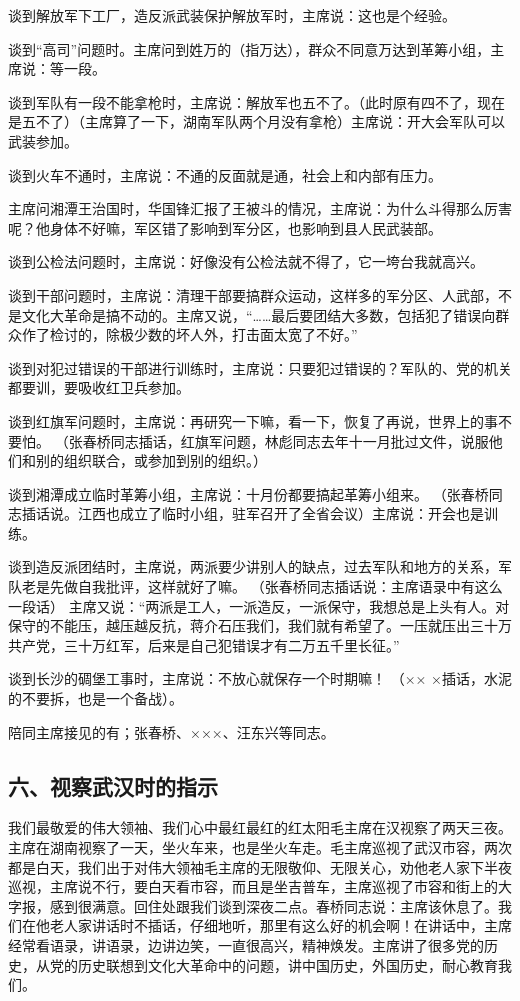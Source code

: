 谈到解放军下工厂，造反派武装保护解放军时，主席说：这也是个经验。

谈到“高司”问题时。主席问到姓万的（指万达），群众不同意万达到革筹小组，主席说：等一段。

谈到军队有一段不能拿枪时，主席说：解放军也五不了。（此时原有四不了，现在是五不了）（主席算了一下，湖南军队两个月没有拿枪）主席说：开大会军队可以武装参加。

谈到火车不通时，主席说：不通的反面就是通，社会上和内部有压力。

主席问湘潭王治国时，华国锋汇报了王被斗的情况，主席说：为什么斗得那么厉害呢？他身体不好嘛，军区错了影响到军分区，也影响到县人民武装部。

谈到公检法问题时，主席说：好像没有公检法就不得了，它一垮台我就高兴。

谈到干部问题时，主席说：清理干部要搞群众运动，这样多的军分区、人武部，不是文化大革命是搞不动的。主席又说，“……最后要团结大多数，包括犯了错误向群众作了检讨的，除极少数的坏人外，打击面太宽了不好。”

谈到对犯过错误的干部进行训练时，主席说：只要犯过错误的？军队的、党的机关都要训，要吸收红卫兵参加。

谈到红旗军问题时，主席说：再研究一下嘛，看一下，恢复了再说，世界上的事不要怕。  （张春桥同志插话，红旗军问题，林彪同志去年十一月批过文件，说服他们和别的组织联合，或参加到别的组织。）

谈到湘潭成立临时革筹小组，主席说：十月份都要搞起革筹小组来。 （张春桥同志插话说。江西也成立了临时小组，驻军召开了全省会议）主席说：开会也是训练。

谈到造反派团结时，主席说，两派要少讲别人的缺点，过去军队和地方的关系，军队老是先做自我批评，这样就好了嘛。 （张春桥同志插话说：主席语录中有这么一段话） 主席又说：“两派是工人，一派造反，一派保守，我想总是上头有人。对保守的不能压，越压越反抗，蒋介石压我们，我们就有希望了。一压就压出三十万共产党，三十万红军，后来是自己犯错误才有二万五千里长征。”

谈到长沙的碉堡工事时，主席说：不放心就保存一个时期嘛！ （×× ×插话，水泥的不要拆，也是一个备战）。

陪同主席接见的有；张春桥、×××、汪东兴等同志。

\subsection{六、视察武汉时的指示}

我们最敬爱的伟大领袖、我们心中最红最红的红太阳毛主席在汉视察了两天三夜。主席在湖南视察了一天，坐火车来，也是坐火车走。毛主席巡视了武汉市容，两次都是白天，我们出于对伟大领袖毛主席的无限敬仰、无限关心，劝他老人家下半夜巡视，主席说不行，要白天看市容，而且是坐吉普车，主席巡视了市容和街上的大字报，感到很满意。回住处跟我们谈到深夜二点。春桥同志说：主席该休息了。我们在他老人家讲话时不插话，仔细地听，那里有这么好的机会啊！在讲话中，主席经常看语录，讲语录，边讲边笑，一直很高兴，精神焕发。主席讲了很多党的历史，从党的历史联想到文化大革命中的问题，讲中国历史，外国历史，耐心教育我们。

